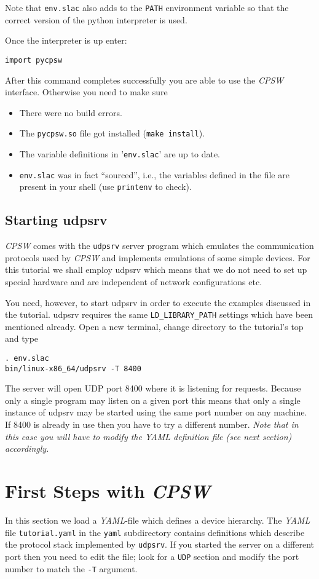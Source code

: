\documentclass[10pt]{article}
\newcommand{\ita}[1]{\emph{#1}}
\newcommand{\cpsw}      {\ita {CPSW}}
\newcommand{\yaml}      {\ita {YAML}}
\newcommand{\py}        {python}
\newcommand{\udps}      {udpsrv}
\newcommand{\cod}[1] {{\tt#1}}
\newcommand{\tutyaml} {\cod{tutorial.yaml}}
\begin{document}
Note that \cod{env.slac} also adds to the \cod{PATH} environment variable so that
the correct version of the \py{} interpreter is used.

Once the interpreter is up enter:

\begin{verbatim}
import pycpsw
\end{verbatim}

After this command completes successfully you are able to use the \cpsw{} interface.
Otherwise you need to make sure
\begin{itemize}
\item There were no build errors.
\item The \cod{pycpsw.so} file got installed (\cod{make install}).
\item The variable definitions in '\cod{env.slac}' are up to date.
\item \cod{env.slac} was in fact ``sourced'', i.e., the variables defined in the
      file are present in your shell (use \cod{printenv} to check).
\end{itemize}

\subsection{Starting \udps}
\cpsw{} comes with the \cod{\udps} server program which emulates the communication
protocols used by \cpsw{} and implements emulations of some simple devices. For this
tutorial we shall employ \udps{} which means that we do not need to set up special
hardware and are independent of network configurations etc.

You need, however, to start \udps{} in order to execute the examples discussed in
the tutorial. \udps{} requires the same \cod{LD\_LIBRARY\_PATH} settings which have
been mentioned already. Open a new terminal, change directory to the tutorial's
top and type
\begin{verbatim}
. env.slac
bin/linux-x86_64/udpsrv -T 8400
\end{verbatim}
The server will open UDP port 8400 where it is listening for requests. Because
only a single program may listen on a given port this means that only a single
instance of \udps{} may be started using the same port number on any machine.
If 8400 is already in use then you have to try a different number. {\em Note
that in this case you will have to modify the YAML definition file
(see next section) accordingly.}


\section{First Steps with \cpsw}
\label{sec:firststeps}
In this section we load a \yaml{}-file which defines a device hierarchy.
The \yaml{} file \tutyaml{} in the \cod{yaml} subdirectory contains
definitions which describe the protocol stack implemented by \cod{\udps}.
If you started the server on a different port then you need to edit the
file; look for a \cod{UDP} section and modify the port number to match
the \cod{-T} argument.
\end{document}
